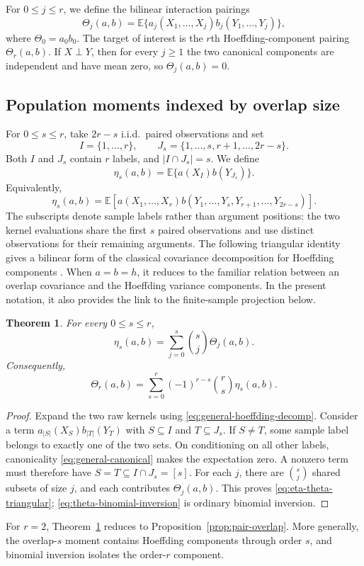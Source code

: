 \documentclass[11pt]{article}
\theoremstyle{plain}
\newtheorem{theorem}{Theorem}[section]
\theoremstyle{definition}
\theoremstyle{remark}
\newcommand{\E}{\mathbb E}
\begin{document}
For $0\le j\le r$, we define the bilinear interaction pairings
\begin{equation*}
 \Theta_j(a,b)
 =\E\{a_j(X_1,\ldots,X_j)b_j(Y_1,\ldots,Y_j)\},
\end{equation*}
where $\Theta_0=a_0b_0$.  The target of interest is the $r$th
Hoeffding-component pairing $\Theta_r(a,b)$.
If $X\perp Y$, then for every $j\ge1$ the two canonical components are
independent and have mean zero, so $\Theta_j(a,b)=0$.

\subsection{Population moments indexed by overlap size}

For $0\le s\le r$, take $2r-s$ i.i.d.\ paired observations and set
\[
 I=\{1,\ldots,r\},
 \qquad
 J_s=\{1,\ldots,s,r+1,\ldots,2r-s\}.
\]
Both $I$ and $J_s$ contain $r$ labels, and $|I\cap J_s|=s$.  We define
\[
 \eta_s(a,b)=\E\{a(X_I)b(Y_{J_s})\}.
\]
Equivalently,
\[
 \eta_s(a,b)
 =\E\left[
 a(X_1,\ldots,X_r)
 b(Y_1,\ldots,Y_s,Y_{r+1},\ldots,Y_{2r-s})
 \right].
\]
The subscripts denote sample labels rather than argument positions: the two
kernel evaluations share the first $s$ paired observations and use distinct
observations for their remaining arguments.  The following triangular identity
gives a bilinear form of the classical
covariance decomposition for Hoeffding components
\citep{Hoeffding1948,Serfling1980}.
When $a=b=h$, it reduces to the familiar relation between an
overlap covariance and the Hoeffding variance components.  In the present
notation, it also provides the link to the finite-sample projection below.


\begin{theorem}
\label{thm:overlap-anova}
For every $0\le s\le r$,
\begin{equation}\label{eq:eta-theta-triangular}
 \eta_s(a,b)=\sum_{j=0}^s\binom sj\Theta_j(a,b).
\end{equation}
Consequently,
\begin{equation}\label{eq:theta-binomial-inversion}
 \Theta_r(a,b)
 =\sum_{s=0}^r(-1)^{r-s}\binom rs\eta_s(a,b).
\end{equation}
\end{theorem}

\begin{proof}
Expand the two raw kernels using
\eqref{eq:general-hoeffding-decomp}.  Consider a term
$a_{|S|}(X_S)b_{|T|}(Y_T)$ with $S\subseteq I$ and $T\subseteq J_s$.
If $S\ne T$, some sample label belongs to exactly one of the two sets.  On
conditioning on all other labels, canonicality
\eqref{eq:general-canonical} makes the expectation zero.  A nonzero term must
therefore have $S=T\subseteq I\cap J_s=[s]$.  For each $j$, there are
$\binom sj$ shared subsets of size $j$, and each contributes
$\Theta_j(a,b)$.  This proves \eqref{eq:eta-theta-triangular};
\eqref{eq:theta-binomial-inversion} is ordinary binomial inversion.
\end{proof}
For $r=2$, Theorem~\ref{thm:overlap-anova} reduces to
Proposition~\ref{prop:pair-overlap}.
More generally, the overlap-$s$ moment contains Hoeffding components through
order $s$, and binomial inversion isolates the order-$r$ component.
\end{document}
